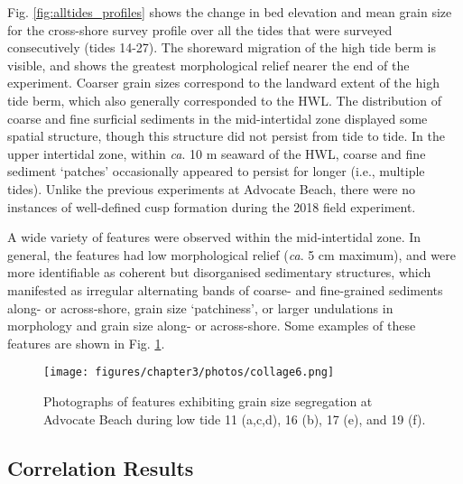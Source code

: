 \documentclass[preprint,12pt,authoryear]{elsarticle}
\begin{document}
Fig. \ref{fig:alltides_profiles} shows the change in bed elevation and mean grain size for the cross-shore survey profile over all the tides that were surveyed consecutively (tides 14-27). The shoreward migration of the high tide berm is visible, and shows the greatest morphological relief nearer the end of the experiment. Coarser grain sizes correspond to the landward extent of the high tide berm, which also generally corresponded to the HWL. The distribution of coarse and fine surficial sediments in the mid-intertidal zone displayed some spatial structure, though this structure did not persist from tide to tide. In the upper intertidal zone, within \textit{ca}. 10 m seaward of the HWL, coarse and fine sediment `patches' occasionally appeared to persist for longer (i.e., multiple tides). Unlike the previous experiments at Advocate Beach, there were no instances of well-defined cusp formation during the 2018 field experiment. 

A wide variety of features were observed within the mid-intertidal zone. In general, the features had low morphological relief (\textit{ca}. 5 cm maximum), and were more identifiable as coherent but disorganised sedimentary structures, which manifested as irregular alternating bands of coarse- and fine-grained sediments along- or across-shore, grain size `patchiness', or larger undulations in morphology and grain size along- or across-shore. Some examples of these features are shown in Fig. \ref{fig:patchiness_photo3}.

\begin{figure}[tbp] %
	\texttt{[image: figures/chapter3/photos/collage6.png]}
	\caption[Photographs of grain size segregation at Advocate Beach]{Photographs of features exhibiting grain size segregation at Advocate Beach during low tide 11 (a,c,d), 16 (b), 17 (e), and 19 (f).}
	\label{fig:patchiness_photo3}
\end{figure}



\subsection{Correlation Results}\label{Results:Correlation}
\end{document}
